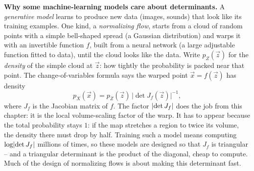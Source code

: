 \begin{applicationbox}
\textbf{Why some machine-learning models care about determinants.} A
\emph{generative model} learns to produce new data (images, sounds) that look like
its training examples. One kind, a \emph{normalizing flow}, starts from a cloud
of random points with a simple bell-shaped spread (a Gaussian distribution) and
warps it with an invertible function $f$, built from a neural network (a large
adjustable function fitted to data), until the cloud looks like the data. Write
$p_Z(\vec z)$ for the \emph{density} of the simple cloud at $\vec z$: how tightly
the probability is packed near that point. The change-of-variables formula says
the warped point $\vec x = f(\vec z)$ has density
\[
  p_X(\vec x) = p_Z(\vec z)\,\bigl|\det J_f(\vec z)\bigr|^{-1},
\]
where $J_f$ is the Jacobian matrix of $f$. The factor $\lvert\det J_f\rvert$ does the
job from this chapter: it is the local volume-scaling factor of the warp. It
has to appear because the total probability stays $1$: if the map stretches a
region to twice its volume, the density there must drop by half. Training such a
model means computing $\log\lvert\det J_f\rvert$ millions of times, so these models are
designed so that $J_f$ is triangular -- and a triangular determinant is the
product of the diagonal, cheap to compute. Much of the design of normalizing
flows is about making this determinant fast.
\end{applicationbox}

